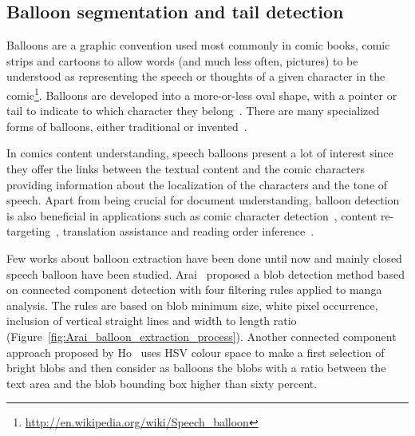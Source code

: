 \subsection{Balloon segmentation and tail detection}
\label{sec:sota:balloon_segmentation}

Balloons are a graphic convention used most commonly in comic books, comic strips and cartoons to allow words (and much less often, pictures) to be understood as representing the speech or thoughts of a given character in the comic\footnote{\url{http://en.wikipedia.org/wiki/Speech_balloon}}.
Balloons are developed into a more-or-less oval shape, with a pointer or tail to indicate to which character they belong~\cite{Goggin2010Rise,Varnum2007Language}.
There are many specialized forms of balloons, either traditional or invented~\cite{Marx2006Writing}.

In comics content understanding, speech balloons present a lot of interest since they offer the links between the textual content and the comic characters providing information about the localization of the characters and the tone of speech.
Apart from being crucial for document understanding, balloon detection is also beneficial in applications such as comic character detection~\cite{Sun2011}, content re-targeting~\cite{Matsui2011}, translation assistance and reading order inference~\cite{Guerin2012Ontologies}.

Few works about balloon extraction have been done until now and mainly closed speech balloon have been studied.
Arai~\cite{Arai11} proposed a blob detection method based on connected component detection with four filtering rules applied to manga analysis.
The rules are based on blob minimum size, white pixel occurrence, inclusion of vertical straight lines and width to length ratio (Figure~\ref{fig:Arai_balloon_extraction_process}).
Another connected component approach proposed by Ho~\cite{Ho2012} uses HSV colour space to make a first selection of bright blobs and then consider as balloons the blobs with a ratio between the text area and the blob bounding box higher than sixty percent.


